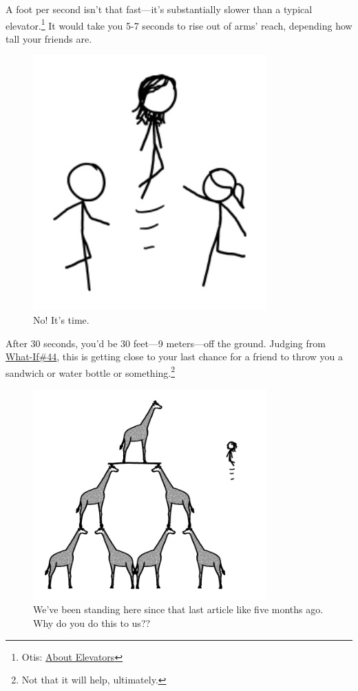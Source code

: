 {{A foot per second isn't that fast—it's substantially slower than a typical elevator.{\footnote{Otis: \href{http://www.otisworldwide.com/pdf/AboutElevators.pdf}{About Elevators}} } It would take you 5-7 seconds to rise out of arms' reach, depending how tall your friends are.}

\begin{figure}[!htbp]
\centering
\includegraphics[scale=0.5, max width=0.8\textwidth]{imgs/a/64/rising_friends.png}
\caption{No!  It's time.}
\end{figure}

{After 30 seconds, you'd be 30 feet—9 meters—off the ground. Judging from \href{http://what-if.xkcd.com/44/}{What-If\#44}, this is getting close to your last chance for a friend to throw you a sandwich or water bottle or something.{\footnote{Not that it will help, ultimately.} } }

\begin{figure}[!htbp]
\centering
\includegraphics[scale=0.5, max width=0.8\textwidth]{imgs/a/64/rising_giraffe.png}
\caption{We've been standing here since that last article like five months ago. Why do you do this to us??}
\end{figure}

}

